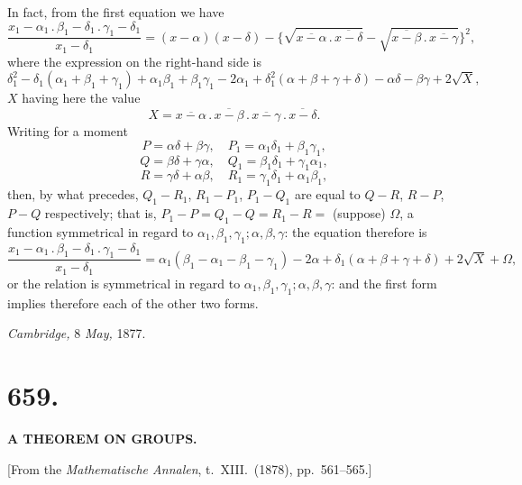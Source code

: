 \documentclass[11pt,a4paper]{article}
\begin{document}
In fact, from the first equation we have
\[
\frac{x_{1} - \alpha_{1}\,.\,\beta_{1} - \delta_{1}\,.\,\gamma_{1} - \delta_{1}}{x_{1} - \delta_{1}} = (x - \alpha)(x - \delta) - \{\sqrt{\overline{x - \alpha}\,.\,\overline{x - \delta}} - \sqrt{\overline{x - \beta}\,.\,\overline{x - \gamma}}\}^{2},
\]
where the expression on the right-hand side is
\[
\delta_{1}^{2} - \delta_{1}(\alpha_{1} + \beta_{1} + \gamma_{1}) + \alpha_{1}\beta_{1} + \beta_{1}\gamma_{1} - 2\alpha_{1} + \delta_{1}^{2}(\alpha + \beta + \gamma + \delta) - \alpha\delta - \beta\gamma + 2\sqrt{X},
\]
$X$ having here the value
\[
X = \overline{x - \alpha}\,.\,\overline{x - \beta}\,.\,\overline{x - \gamma}\,.\,\overline{x - \delta}.
\]
Writing for a moment
\[
P = \alpha\delta + \beta\gamma, \quad P_{1} = \alpha_{1}\delta_{1} + \beta_{1}\gamma_{1},
\]
\[
Q = \beta\delta + \gamma\alpha, \quad Q_{1} = \beta_{1}\delta_{1} + \gamma_{1}\alpha_{1},
\]
\[
R = \gamma\delta + \alpha\beta, \quad R_{1} = \gamma_{1}\delta_{1} + \alpha_{1}\beta_{1},
\]
then, by what precedes, $Q_{1} - R_{1}$, $R_{1} - P_{1}$, $P_{1} - Q_{1}$ are equal to $Q - R$, $R - P$, $P - Q$ respectively; that is, $P_{1} - P = Q_{1} - Q = R_{1} - R =$ (suppose) $\Omega$, a function symmetrical in regard to $\alpha_{1}, \beta_{1}, \gamma_{1}; \alpha, \beta, \gamma$: the equation therefore is
\[
\frac{x_{1} - \alpha_{1}\,.\,\beta_{1} - \delta_{1}\,.\,\gamma_{1} - \delta_{1}}{x_{1} - \delta_{1}} = \alpha_{1}(\beta_{1} - \alpha_{1} - \beta_{1} - \gamma_{1}) - 2\alpha + \delta_{1}(\alpha + \beta + \gamma + \delta) + 2\sqrt{X} + \Omega,
\]
or the relation is symmetrical in regard to $\alpha_{1}, \beta_{1}, \gamma_{1}; \alpha, \beta, \gamma$: and the first form implies therefore each of the other two forms.

\medskip

\hfill \emph{Cambridge,} 8 \emph{May,} 1877.

\newpage


\section*{659.}

\begin{center}
\textbf{A THEOREM ON GROUPS.}
\end{center}

\medskip

\begin{center}
[From the \emph{Mathematische Annalen}, t.~XIII.\ (1878), pp.~561--565.]
\end{center}
\end{document}
